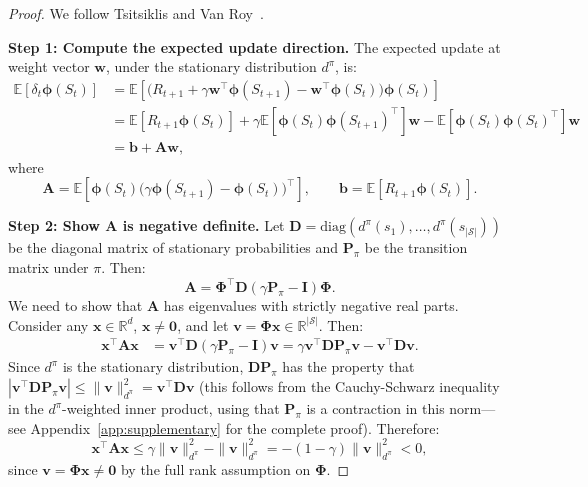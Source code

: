 \documentclass[11pt,a4paper]{article}
\theoremstyle{definition}
\theoremstyle{plain}
\theoremstyle{remark}
\newcommand{\E}{\mathbb{E}}
\newcommand{\R}{\mathbb{R}}
\begin{document}
\begin{proof}
We follow Tsitsiklis and Van Roy~\cite{tsitsiklis1997}.

\textbf{Step 1: Compute the expected update direction.} The expected update at weight vector $\bm{w}$, under the stationary distribution $d^\pi$, is:
\begin{align}
    \E[\delta_t \bm{\phi}(S_t)]
    &= \E\!\left[\bigl(R_{t+1} + \gamma \bm{w}^\top\bm{\phi}(S_{t+1}) - \bm{w}^\top\bm{\phi}(S_t)\bigr)\bm{\phi}(S_t)\right] \nonumber\\
    &= \E[R_{t+1}\bm{\phi}(S_t)] + \gamma\E[\bm{\phi}(S_t)\bm{\phi}(S_{t+1})^\top]\bm{w} - \E[\bm{\phi}(S_t)\bm{\phi}(S_t)^\top]\bm{w} \nonumber\\
    &= \bm{b} + \bm{A}\bm{w}, \label{eq:expected_update}
\end{align}
where
\begin{equation}
    \bm{A} = \E\!\left[\bm{\phi}(S_t)\bigl(\gamma\bm{\phi}(S_{t+1}) - \bm{\phi}(S_t)\bigr)^\top\right], \qquad
    \bm{b} = \E[R_{t+1}\bm{\phi}(S_t)].
    \label{eq:A_and_b}
\end{equation}

\textbf{Step 2: Show $\bm{A}$ is negative definite.} Let $\bm{D} = \text{diag}(d^\pi(s_1), \ldots, d^\pi(s_{|\mathcal{S}|}))$ be the diagonal matrix of stationary probabilities and $\bm{P}_\pi$ be the transition matrix under $\pi$. Then:
\begin{equation}
    \bm{A} = \bm{\Phi}^\top \bm{D}(\gamma \bm{P}_\pi - \bm{I})\bm{\Phi}.
    \label{eq:A_matrix_form}
\end{equation}
We need to show that $\bm{A}$ has eigenvalues with strictly negative real parts. Consider any $\bm{x} \in \R^d$, $\bm{x} \neq \bm{0}$, and let $\bm{v} = \bm{\Phi}\bm{x} \in \R^{|\mathcal{S}|}$. Then:
\begin{align}
    \bm{x}^\top \bm{A} \bm{x}
    &= \bm{v}^\top \bm{D}(\gamma \bm{P}_\pi - \bm{I})\bm{v}
    = \gamma \bm{v}^\top \bm{D}\bm{P}_\pi \bm{v} - \bm{v}^\top \bm{D}\bm{v}. \label{eq:quadratic_A}
\end{align}
Since $d^\pi$ is the stationary distribution, $\bm{D}\bm{P}_\pi$ has the property that $|\bm{v}^\top \bm{D}\bm{P}_\pi \bm{v}| \leq \|\bm{v}\|_{d^\pi}^2 = \bm{v}^\top \bm{D}\bm{v}$ (this follows from the Cauchy-Schwarz inequality in the $d^\pi$-weighted inner product, using that $\bm{P}_\pi$ is a contraction in this norm---see Appendix~\ref{app:supplementary} for the complete proof). Therefore:
\begin{equation}
    \bm{x}^\top \bm{A}\bm{x} \leq \gamma\|\bm{v}\|_{d^\pi}^2 - \|\bm{v}\|_{d^\pi}^2 = -(1-\gamma)\|\bm{v}\|_{d^\pi}^2 < 0,
    \label{eq:A_neg_def}
\end{equation}
since $\bm{v} = \bm{\Phi}\bm{x} \neq \bm{0}$ by the full rank assumption on $\bm{\Phi}$.


\end{proof}
\end{document}
